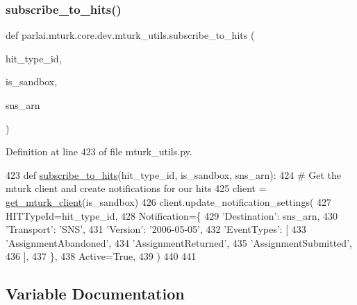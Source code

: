 \subsubsection{\texorpdfstring{subscribe\+\_\+to\+\_\+hits()}{subscribe\_to\_hits()}}
{\footnotesize\ttfamily def parlai.\+mturk.\+core.\+dev.\+mturk\+\_\+utils.\+subscribe\+\_\+to\+\_\+hits (\begin{DoxyParamCaption}\item[{}]{hit\+\_\+type\+\_\+id,  }\item[{}]{is\+\_\+sandbox,  }\item[{}]{sns\+\_\+arn }\end{DoxyParamCaption})}



Definition at line 423 of file mturk\+\_\+utils.\+py.


\begin{DoxyCode}
423 \textcolor{keyword}{def }\hyperlink{namespaceparlai_1_1mturk_1_1core_1_1mturk__utils_accc5838e30ccf9ab95050ab11ac0d973}{subscribe\_to\_hits}(hit\_type\_id, is\_sandbox, sns\_arn):
424     \textcolor{comment}{# Get the mturk client and create notifications for our hits}
425     client = \hyperlink{namespaceparlai_1_1mturk_1_1core_1_1mturk__utils_a577e2527c04682284394b0951a090695}{get\_mturk\_client}(is\_sandbox)
426     client.update\_notification\_settings(
427         HITTypeId=hit\_type\_id,
428         Notification=\{
429             \textcolor{stringliteral}{'Destination'}: sns\_arn,
430             \textcolor{stringliteral}{'Transport'}: \textcolor{stringliteral}{'SNS'},
431             \textcolor{stringliteral}{'Version'}: \textcolor{stringliteral}{'2006-05-05'},
432             \textcolor{stringliteral}{'EventTypes'}: [
433                 \textcolor{stringliteral}{'AssignmentAbandoned'},
434                 \textcolor{stringliteral}{'AssignmentReturned'},
435                 \textcolor{stringliteral}{'AssignmentSubmitted'},
436             ],
437         \},
438         Active=\textcolor{keyword}{True},
439     )
440 
441 
\end{DoxyCode}


\subsection{Variable Documentation}
\mbox{\label{namespaceparlai_1_1mturk_1_1core_1_1dev_1_1mturk__utils_ab502738358dcb1b59d34a1443b21834e}} 
